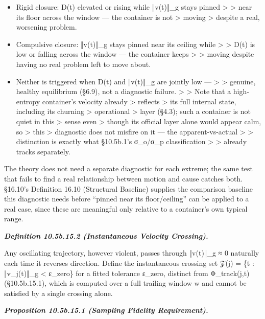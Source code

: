 \documentclass[
]{article}
\begin{document}
\begin{itemize}
\item
  Rigid closure: D(t) elevated or rising while ‖v(t)‖\_g stays pinned
  \textgreater{} \textgreater{} near its floor across the window --- the
  container is not \textgreater{} moving \textgreater{} despite a real,
  worsening problem.
\item
  Compulsive closure: ‖v(t)‖\_g stays pinned near its ceiling while
  \textgreater{} \textgreater{} D(t) is low or falling across the window
  --- the container keeps \textgreater{} \textgreater{} moving despite
  having no real problem left to move about.
\item
  Neither is triggered when D(t) and ‖v(t)‖\_g are jointly low ---
  \textgreater{} \textgreater{} genuine, healthy equilibrium (§6.9), not
  a diagnostic failure. \textgreater{} \textgreater{} Note that a
  high-entropy container's velocity already \textgreater{} reflects
  \textgreater{} its full internal state, including its churning
  \textgreater{} operational \textgreater{} layer (§4.3); such a
  container is not quiet in this \textgreater{} sense even
  \textgreater{} though its official layer alone would appear calm, so
  \textgreater{} this \textgreater{} diagnostic does not misfire on it
  --- the apparent-vs-actual \textgreater{} \textgreater{} distinction
  is exactly what §10.5b.1's σ\_o/σ\_p classification \textgreater{}
  \textgreater{} already tracks separately.
\end{itemize}

The theory does not need a separate diagnostic for each extreme; the
same test that fails to find a real relationship between motion and
cause catches both. §16.10's Definition 16.10 (Structural Baseline)
supplies the comparison baseline this diagnostic needs before ``pinned
near its floor/ceiling'' can be applied to a real case, since these are
meaningful only relative to a container's own typical range.

\emph{\textbf{Definition 10.5b.15.2 (Instantaneous Velocity Crossing).}}

Any oscillating trajectory, however violent, passes through ‖v(t)‖\_g ≈
0 naturally each time it reverses direction. Define the instantaneous
crossing set 𝒵(j) = \{t : ‖v\_j(t)‖\_g \textless{} ε\_zero\} for a
fitted tolerance ε\_zero, distinct from Φ\_track(j,t) (§10.5b.15.1),
which is computed over a full trailing window w and cannot be satisfied
by a single crossing alone.

\emph{\textbf{Proposition 10.5b.15.1 (Sampling Fidelity Requirement).}}
\end{document}
